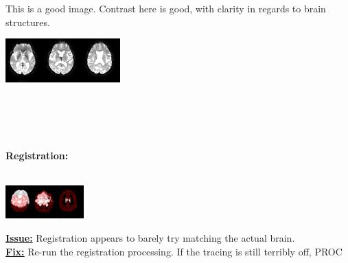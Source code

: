 \documentclass[12pt]{article}
\begin{document}
\noindent\begin{minipage}{0.45\textwidth}
	This is a good image. Contrast here is good, with clarity in regards to brain structures. 
\end{minipage}%
\hfill%
\begin{minipage}{0.45\textwidth}
	\includegraphics[scale=1.25]{tsnr_good1.png}
\end{minipage}
\\\\\\\\
\large{\textbf{Registration:}}
\\\\
\noindent\begin{minipage}{0.45\textwidth}
	\includegraphics[scale=1.75]{badreg3.png}
\end{minipage}%
\hfill%
\begin{minipage}{0.45\textwidth}
	\underline{\textbf{Issue:}} Registration appears to barely try matching the actual brain. \\
	\underline{\textbf{Fix:}} Re-run the registration processing. If the tracing is still terribly off, PROC
\end{minipage}\newline\newline
\end{document}
